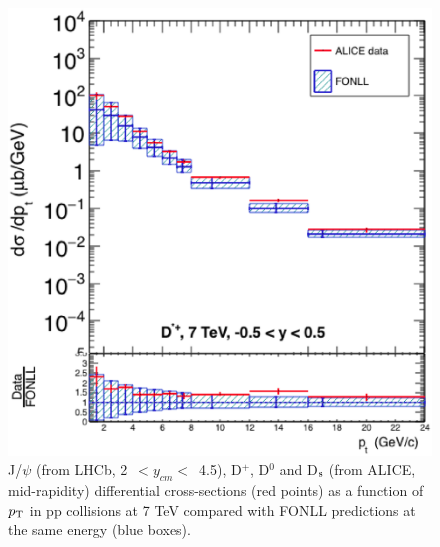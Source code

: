 \begin{figure}[!htbp]
\begin{center}
\includegraphics[width=.45\textwidth]{FigCap4/Dstar_7TeV_y_05_05.eps}
\caption{J/$\psi$ (from LHCb, \mbox{2 $< y_{cm} <$ 4.5}), D$^{+}$, D$^{0}$ and D$_{\rm s}$ (from ALICE, mid-rapidity) differential cross-sections (red points) as a function of $p_{\rm T}$ in pp collisions at 7 TeV compared with FONLL predictions at the same energy (blue boxes). }
\label{fig:Dmesons}
\end{center}
\end{figure}
